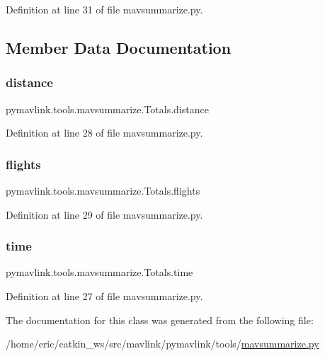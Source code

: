 Definition at line 31 of file mavsummarize.\+py.



\subsection{Member Data Documentation}
\mbox{\label{classpymavlink_1_1tools_1_1mavsummarize_1_1Totals_a6870dae3b849727b5dbabcc8715de751}} 
\subsubsection{\texorpdfstring{distance}{distance}}
{\footnotesize\ttfamily pymavlink.\+tools.\+mavsummarize.\+Totals.\+distance}



Definition at line 28 of file mavsummarize.\+py.

\mbox{\label{classpymavlink_1_1tools_1_1mavsummarize_1_1Totals_a6dd092e8fd7d6e18d60d167df37d4d06}} 
\subsubsection{\texorpdfstring{flights}{flights}}
{\footnotesize\ttfamily pymavlink.\+tools.\+mavsummarize.\+Totals.\+flights}



Definition at line 29 of file mavsummarize.\+py.

\mbox{\label{classpymavlink_1_1tools_1_1mavsummarize_1_1Totals_ae80f37b87665285091c33bdc8a7b3b87}} 
\subsubsection{\texorpdfstring{time}{time}}
{\footnotesize\ttfamily pymavlink.\+tools.\+mavsummarize.\+Totals.\+time}



Definition at line 27 of file mavsummarize.\+py.



The documentation for this class was generated from the following file\+:\begin{DoxyCompactItemize}
\item 
/home/eric/catkin\+\_\+ws/src/mavlink/pymavlink/tools/\mbox{\hyperlink{mavsummarize_8py}{mavsummarize.\+py}}\end{DoxyCompactItemize}
